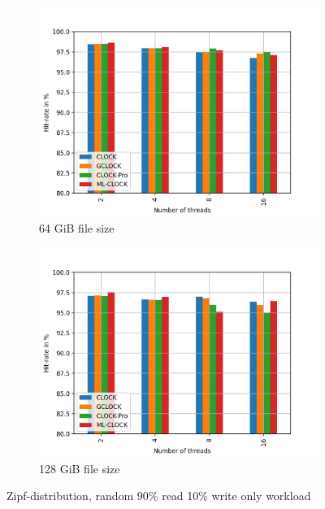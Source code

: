 \documentclass[
	12pt,
	a4paper,
	abstract,
	bibliography=totoc,
	chapterprefix,
	headings=openright,
	numbers=endperiod,
	parskip=half,
	twoside,
]{scrreprt}
\begin{document}
\begin{figure}[H]
\begin{subfigure}{0.4\textwidth}
		\includegraphics[width=\textwidth]{multi_64_gb_rw_90to10_zipf.jpg}		
		\caption{64 GiB file size}
		\label{fig:rw_90to10  zoned}
	\end{subfigure}
	\hfill
	\begin{subfigure}{0.4\textwidth}
		\includegraphics[width=\textwidth]{multi_128_gb_rw_90to10_zipf.jpg}		
		\caption{128 GiB file size}
		\label{fig:rw_90to10  uniform}
	\end{subfigure}
	\caption{Zipf-distribution, random 90\% read 10\% write only workload}
	\label{fig:multi zipf rw_90to10}
\end{figure}
\end{document}
